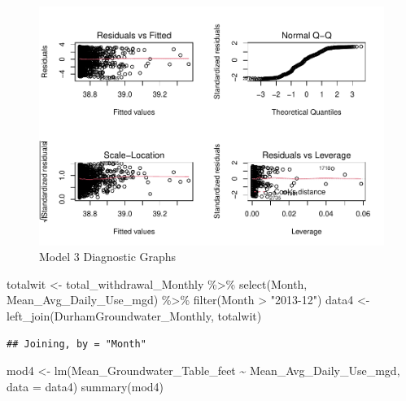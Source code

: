 \documentclass[
  12pt,
]{article}
\newenvironment{Shaded}{\begin{snugshade}}{\end{snugshade}}
\newcommand{\AttributeTok}[1]{\textcolor[rgb]{0.77,0.63,0.00}{#1}}
\newcommand{\FunctionTok}[1]{\textcolor[rgb]{0.00,0.00,0.00}{#1}}
\newcommand{\NormalTok}[1]{#1}
\newcommand{\OtherTok}[1]{\textcolor[rgb]{0.56,0.35,0.01}{#1}}
\newcommand{\SpecialCharTok}[1]{\textcolor[rgb]{0.00,0.00,0.00}{#1}}
\newcommand{\StringTok}[1]{\textcolor[rgb]{0.31,0.60,0.02}{#1}}
\begin{document}
\begin{figure}
\centering
\includegraphics{Project_files/figure-latex/groundwater and precipitation-1.pdf}
\caption{Model 3 Diagnostic Graphs}
\end{figure}

\begin{Shaded}
\begin{Highlighting}[]
\NormalTok{totalwit }\OtherTok{\textless{}{-}}\NormalTok{ total\_withdrawal\_Monthly }\SpecialCharTok{\%\textgreater{}\%}
  \FunctionTok{select}\NormalTok{(Month, Mean\_Avg\_Daily\_Use\_mgd) }\SpecialCharTok{\%\textgreater{}\%}
  \FunctionTok{filter}\NormalTok{(Month }\SpecialCharTok{\textgreater{}} \StringTok{"2013{-}12"}\NormalTok{)}
\NormalTok{data4 }\OtherTok{\textless{}{-}} \FunctionTok{left\_join}\NormalTok{(DurhamGroundwater\_Monthly, totalwit) }
\end{Highlighting}
\end{Shaded}

\begin{verbatim}
## Joining, by = "Month"
\end{verbatim}

\begin{Shaded}
\begin{Highlighting}[]
\NormalTok{mod4 }\OtherTok{\textless{}{-}} \FunctionTok{lm}\NormalTok{(Mean\_Groundwater\_Table\_feet }\SpecialCharTok{\textasciitilde{}}\NormalTok{ Mean\_Avg\_Daily\_Use\_mgd, }\AttributeTok{data =}\NormalTok{ data4)}
\FunctionTok{summary}\NormalTok{(mod4)}
\end{Highlighting}
\end{Shaded}
\end{document}
